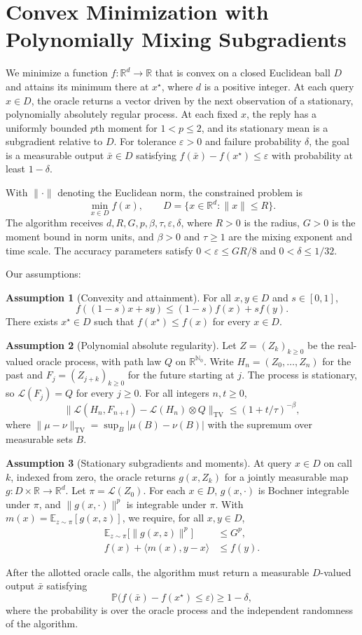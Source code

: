 \documentclass[10pt]{article}
\theoremstyle{definition}
\newtheorem{assumption}{Assumption}
\begin{document}
\section*{Convex Minimization with Polynomially Mixing Subgradients}
We minimize a function $f:\mathbb{R}^d\to\mathbb{R}$ that is convex on a closed Euclidean ball $D$ and attains its minimum there at $x^\star$, where $d$ is a positive integer. At each query $x\in D$, the oracle returns a vector driven by the next observation of a stationary, polynomially absolutely regular process. At each fixed $x$, the reply has a uniformly bounded $p$th moment for $1<p\leq2$, and its stationary mean is a subgradient relative to $D$. For tolerance $\varepsilon>0$ and failure probability $\delta$, the goal is a measurable output $\bar{x}\in D$ satisfying $f(\bar{x})-f(x^\star)\leq\varepsilon$ with probability at least $1-\delta$.

With $\|\cdot\|$ denoting the Euclidean norm, the constrained problem is
\[
\min_{x\in D} f(x),\qquad D=\{x\in\mathbb{R}^d:\|x\|\leq R\}.
\]
The algorithm receives $d,R,G,p,\beta,\tau,\varepsilon,\delta$, where $R>0$ is the radius, $G>0$ is the moment bound in norm units, and $\beta>0$ and $\tau\geq1$ are the mixing exponent and time scale. The accuracy parameters satisfy $0<\varepsilon\leq GR/8$ and $0<\delta\leq1/32$.

Our assumptions:
\begin{assumption}[Convexity and attainment]
For all $x,y\in D$ and $s\in[0,1]$,
\[
f((1-s)x+sy)\leq(1-s)f(x)+sf(y).
\]
There exists $x^\star\in D$ such that $f(x^\star)\leq f(x)$ for every $x\in D$.
\end{assumption}

\begin{assumption}[Polynomial absolute regularity]
Let $Z=(Z_k)_{k\geq0}$ be the real-valued oracle process, with path law $Q$ on $\mathbb{R}^{\mathbb{N}_0}$. Write $H_n=(Z_0,\ldots,Z_n)$ for the past and $F_j=(Z_{j+k})_{k\geq0}$ for the future starting at $j$. The process is stationary, so $\mathcal{L}(F_j)=Q$ for every $j\geq0$. For all integers $n,t\geq0$,
\[
\bigl\|\mathcal{L}(H_n,F_{n+t})-\mathcal{L}(H_n)\otimes Q\bigr\|_{\mathrm{TV}}
\leq (1+t/\tau)^{-\beta},
\]
where $\|\mu-\nu\|_{\mathrm{TV}}=\sup_B|\mu(B)-\nu(B)|$ with the supremum over measurable sets $B$.
\end{assumption}

\begin{assumption}[Stationary subgradients and moments]
At query $x\in D$ on call $k$, indexed from zero, the oracle returns $g(x,Z_k)$ for a jointly measurable map $g:D\times\mathbb{R}\to\mathbb{R}^d$. Let $\pi=\mathcal{L}(Z_0)$. For each $x\in D$, $g(x,\cdot)$ is Bochner integrable under $\pi$, and $\|g(x,\cdot)\|^p$ is integrable under $\pi$. With $m(x)=\mathbb{E}_{z\sim\pi}[g(x,z)]$, we require, for all $x,y\in D$,
\[
\begin{aligned}
\mathbb{E}_{z\sim\pi}\bigl[\|g(x,z)\|^p\bigr]&\leq G^p,\\
f(x)+\langle m(x),y-x\rangle&\leq f(y).
\end{aligned}
\]
\end{assumption}

After the allotted oracle calls, the algorithm must return a measurable $D$-valued output $\bar{x}$ satisfying
\[
\mathbb{P}\bigl(f(\bar{x})-f(x^\star)\leq\varepsilon\bigr)\geq1-\delta,
\]
where the probability is over the oracle process and the independent randomness of the algorithm.
\end{document}
